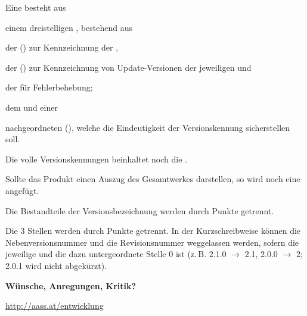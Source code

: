 {\bigskip

Eine  besteht aus
\begin{compactenum}
  \item einem dreistelligen , bestehend aus
  \begin{compactenum}
    \item der  
    () 
    zur Kennzeichnung der ,
    \item der  
    () 
    zur Kennzeichnung von Update-Versionen der jeweiligen 
     und
    \item der  für Fehlerbehebung;
  \end{compactenum}
  \item dem  und einer
  \item nachgeordneten 
   (), 
  welche die Eindeutigkeit der Versionskennung sicherstellen soll.
  \item Die volle Versionskennungen beinhaltet noch die 
  .
  \item Sollte das Produkt einen Auszug des Gesamtwerkes darstellen, 
  so wird noch eine  angefügt.
\end{compactenum}
Die Bestandteile der Versionsbezeichnung werden durch Punkte getrennt.

\begin{Synopsis}
\end{Synopsis}

Die 3 Stellen werden durch Punkte getrennt.
In der Kurzschreibweise können die Nebenversionsnummer und die 
Revisionsnummer weggelassen werden, sofern die jeweilige und die dazu 
untergeordnete Stelle 0 ist 
(z.\,B. 2.1.0 $\longrightarrow$ 2.1,
2.0.0 $\longrightarrow$ 2; 
2.0.1 wird nicht abgekürzt).
}%
{}%

\bigskip

\begin{center}
\sffamily\bfseries\LARGE\color{Base} Wünsche, Anregungen, Kritik?

\Huge\color{DefaultRed}\url{http://aass.at/entwicklung}

\end{center}
